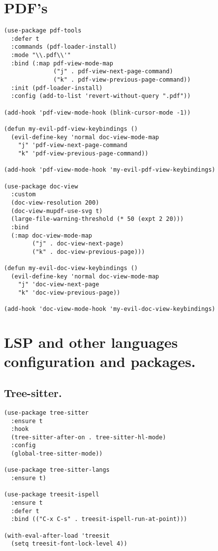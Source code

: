 \documentclass[11pt]{article}
\begin{document}
\section{PDF's}
\label{sec:org3f2c3e8}
\begin{verbatim}
(use-package pdf-tools
  :defer t
  :commands (pdf-loader-install)
  :mode "\\.pdf\\'"
  :bind (:map pdf-view-mode-map
              ("j" . pdf-view-next-page-command)
              ("k" . pdf-view-previous-page-command))
  :init (pdf-loader-install)
  :config (add-to-list 'revert-without-query ".pdf"))

(add-hook 'pdf-view-mode-hook (blink-cursor-mode -1))

(defun my-evil-pdf-view-keybindings ()
  (evil-define-key 'normal doc-view-mode-map
    "j" 'pdf-view-next-page-command
    "k" 'pdf-view-previous-page-command))

(add-hook 'pdf-view-mode-hook 'my-evil-pdf-view-keybindings)

(use-package doc-view
  :custom
  (doc-view-resolution 200)
  (doc-view-mupdf-use-svg t)
  (large-file-warning-threshold (* 50 (expt 2 20)))
  :bind
  (:map doc-view-mode-map
        ("j" . doc-view-next-page)
        ("k" . doc-view-previous-page)))

(defun my-evil-doc-view-keybindings ()
  (evil-define-key 'normal doc-view-mode-map
    "j" 'doc-view-next-page
    "k" 'doc-view-previous-page))

(add-hook 'doc-view-mode-hook 'my-evil-doc-view-keybindings)
\end{verbatim}
\section{LSP and other languages configuration and packages.}
\label{sec:org7703c8c}
\subsection{Tree-sitter.}
\label{sec:orgd4adf96}
\begin{verbatim}
(use-package tree-sitter
  :ensure t
  :hook
  (tree-sitter-after-on . tree-sitter-hl-mode)
  :config
  (global-tree-sitter-mode))

(use-package tree-sitter-langs
  :ensure t)

(use-package treesit-ispell
  :ensure t
  :defer t
  :bind (("C-x C-s" . treesit-ispell-run-at-point)))

(with-eval-after-load 'treesit
  (setq treesit-font-lock-level 4))
\end{verbatim}
\end{document}
